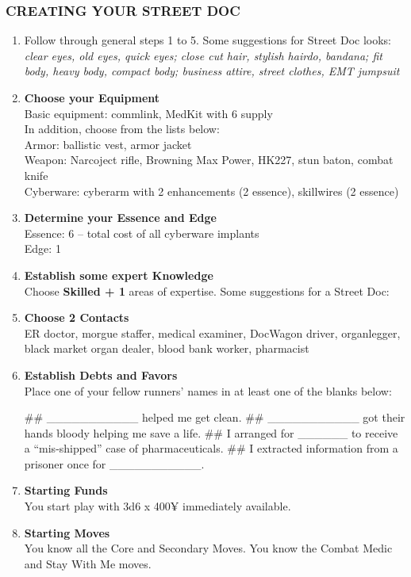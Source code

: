 \subsubsection{CREATING YOUR STREET DOC}
\begin{enumerate}
    \item Follow through general steps 1 to 5. Some suggestions for Street Doc looks: \textit{clear eyes, old eyes, quick eyes; close cut hair, stylish hairdo, bandana; fit body, heavy body, compact body; business attire, street clothes, EMT jumpsuit}
    
    \item \textbf{Choose your Equipment} \\
    Basic equipment: commlink, MedKit with 6 supply \\
    In addition, choose from the lists below: \\
    Armor: ballistic vest, armor jacket \\
    Weapon: Narcoject rifle, Browning Max Power, HK227, stun baton, combat knife \\
    Cyberware: cyberarm with 2 enhancements (2 essence), skillwires (2 essence) \\
    
    \item \textbf{Determine your Essence and Edge} \\
    Essence: 6 – total cost of all cyberware implants \\
    Edge: 1

    \item \textbf{Establish some expert Knowledge} \\
    Choose \textbf{\textsf{Skilled + 1}} areas of expertise. Some suggestions for a Street Doc: \textit{}
    
    \item \textbf{Choose 2 Contacts} \\
    ER doctor, morgue staffer, medical examiner, DocWagon driver, organlegger, black market organ dealer, blood bank worker, pharmacist
    
    \item \textbf{Establish Debts and Favors} \\
    Place one of your fellow runners’ names in at least one of the blanks below:
        \begin{easylist}
            ## \_\_\_\_\_\_\_\_\_\_\_ helped me get clean.
            ## \_\_\_\_\_\_\_\_\_\_\_ got their hands bloody helping me save a life.
            ## I arranged for \_\_\_\_\_\_ to receive a “mis-shipped” case of pharmaceuticals.
            ## I extracted information from a prisoner once for \_\_\_\_\_\_\_\_\_\_\_.
        \end{easylist}
    
    \item \textbf{Starting Funds} \\
    You start play with 3d6 x 400¥ immediately available.
    
    \item \textbf{Starting Moves} \\
    You know all the Core and Secondary Moves. You know the Combat Medic and Stay With Me moves.
\end{enumerate}

